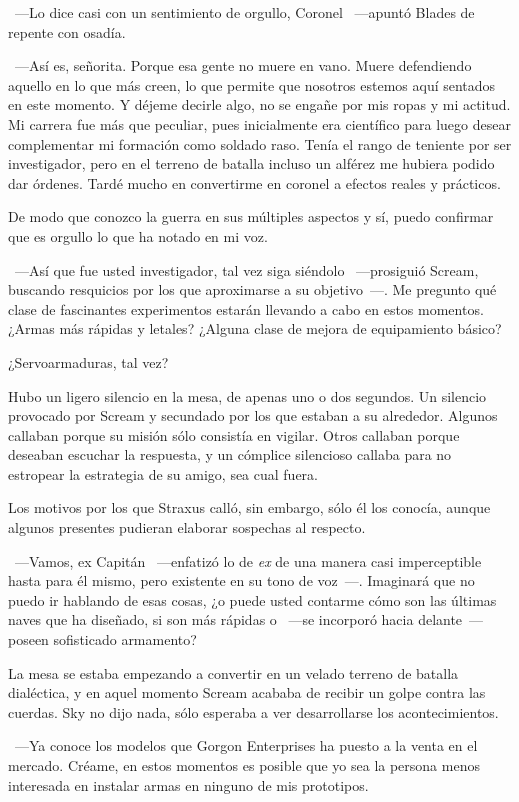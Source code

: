 ~---Lo dice casi con un sentimiento de orgullo, Coronel ~---apuntó Blades de repente con osadía.

~---Así es, señorita. Porque esa gente no muere en vano. Muere defendiendo aquello en lo que más creen, lo que permite que nosotros estemos aquí sentados en este momento. Y déjeme decirle algo, no se engañe por mis ropas y mi actitud. Mi carrera fue más que peculiar, pues inicialmente era científico para luego desear complementar mi formación como soldado raso. Tenía el rango de teniente por ser investigador, pero en el terreno de batalla incluso un alférez me hubiera podido dar órdenes. Tardé mucho en convertirme en coronel a efectos reales y prácticos.

\rquoti{}De modo que conozco la guerra en sus múltiples aspectos y sí, puedo confirmar que es orgullo lo que ha notado en mi voz.

~---Así que fue usted investigador, tal vez siga siéndolo ~---prosiguió Scream, buscando resquicios por los que aproximarse a su objetivo~---. Me pregunto qué clase de fascinantes experimentos estarán llevando a cabo en estos momentos. ¿Armas más rápidas y letales? ¿Alguna clase de mejora de equipamiento básico?

\rquoti{}¿Servoarmaduras, tal vez?

Hubo un ligero silencio en la mesa, de apenas uno o dos segundos. Un silencio provocado por Scream y secundado por los que estaban a su alrededor. Algunos callaban porque su misión sólo consistía en vigilar. Otros callaban porque deseaban escuchar la respuesta, y un cómplice silencioso callaba para no estropear la estrategia de su amigo, sea cual fuera.

Los motivos por los que Straxus calló, sin embargo, sólo él los conocía, aunque algunos presentes pudieran elaborar sospechas al respecto.

~---Vamos, ex Capitán ~---enfatizó lo de \emph{ex} de una manera casi imperceptible hasta para él mismo, pero existente en su tono de voz~---. Imaginará que no puedo ir hablando de esas cosas, ¿o puede usted contarme cómo son las últimas naves que ha diseñado, si son más rápidas o ~---se incorporó hacia delante~--- poseen sofisticado armamento?

La mesa se estaba empezando a convertir en un velado terreno de batalla dialéctica, y en aquel momento Scream acababa de recibir un golpe contra las cuerdas. Sky no dijo nada, sólo esperaba a ver desarrollarse los acontecimientos.

~---Ya conoce los modelos que Gorgon Enterprises ha puesto a la venta en el mercado. Créame, en estos momentos es posible que yo sea la persona menos interesada en instalar armas en ninguno de mis prototipos.

